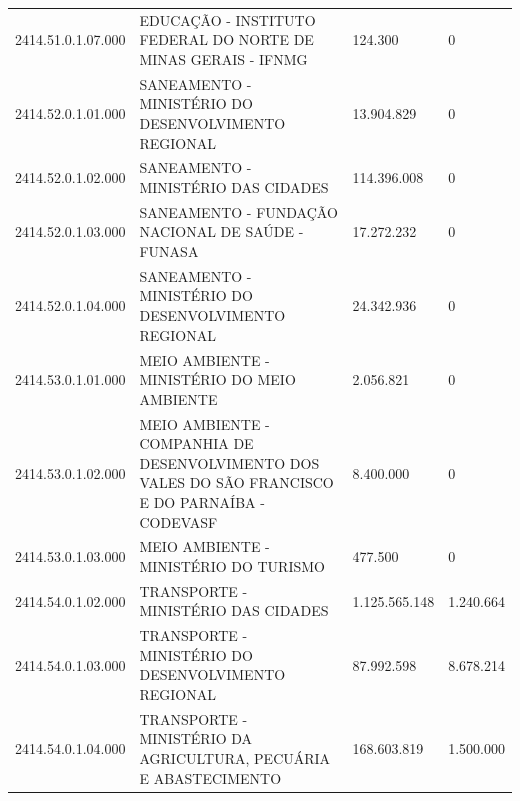 \documentclass{article}
\begin{document}
\begin{longtable}[c]{m{2cm}|m{11cm}|m{2cm}m{2cm}}
\multicolumn{1}{C{2cm}|}{2414.51.0.1.07.000} & \multicolumn{1}{L{11cm}|}{EDUCAÇÃO - INSTITUTO FEDERAL DO NORTE DE MINAS GERAIS - IFNMG} & \multicolumn{1}{R{2cm}|}{124.300} & \multicolumn{1}{R{2cm}}{            0} \\
\multicolumn{1}{C{2cm}|}{2414.52.0.1.01.000} & \multicolumn{1}{L{11cm}|}{SANEAMENTO - MINISTÉRIO DO DESENVOLVIMENTO REGIONAL} & \multicolumn{1}{R{2cm}|}{13.904.829} & \multicolumn{1}{R{2cm}}{            0} \\
\multicolumn{1}{C{2cm}|}{2414.52.0.1.02.000} & \multicolumn{1}{L{11cm}|}{SANEAMENTO - MINISTÉRIO DAS CIDADES} & \multicolumn{1}{R{2cm}|}{114.396.008} & \multicolumn{1}{R{2cm}}{            0} \\
\multicolumn{1}{C{2cm}|}{2414.52.0.1.03.000} & \multicolumn{1}{L{11cm}|}{SANEAMENTO - FUNDAÇÃO NACIONAL DE SAÚDE - FUNASA} & \multicolumn{1}{R{2cm}|}{17.272.232} & \multicolumn{1}{R{2cm}}{            0} \\
\multicolumn{1}{C{2cm}|}{2414.52.0.1.04.000} & \multicolumn{1}{L{11cm}|}{SANEAMENTO - MINISTÉRIO DO DESENVOLVIMENTO REGIONAL} & \multicolumn{1}{R{2cm}|}{24.342.936} & \multicolumn{1}{R{2cm}}{            0} \\
\multicolumn{1}{C{2cm}|}{2414.53.0.1.01.000} & \multicolumn{1}{L{11cm}|}{MEIO AMBIENTE - MINISTÉRIO DO MEIO AMBIENTE} & \multicolumn{1}{R{2cm}|}{2.056.821} & \multicolumn{1}{R{2cm}}{            0} \\
\multicolumn{1}{C{2cm}|}{2414.53.0.1.02.000} & \multicolumn{1}{L{11cm}|}{MEIO AMBIENTE - COMPANHIA DE DESENVOLVIMENTO DOS VALES DO SÃO FRANCISCO E DO PARNAÍBA - CODEVASF} & \multicolumn{1}{R{2cm}|}{8.400.000} & \multicolumn{1}{R{2cm}}{            0} \\
\multicolumn{1}{C{2cm}|}{2414.53.0.1.03.000} & \multicolumn{1}{L{11cm}|}{MEIO AMBIENTE - MINISTÉRIO DO TURISMO} & \multicolumn{1}{R{2cm}|}{477.500} & \multicolumn{1}{R{2cm}}{            0} \\
\multicolumn{1}{C{2cm}|}{2414.54.0.1.02.000} & \multicolumn{1}{L{11cm}|}{TRANSPORTE - MINISTÉRIO DAS CIDADES} & \multicolumn{1}{R{2cm}|}{1.125.565.148} & \multicolumn{1}{R{2cm}}{1.240.664} \\
\multicolumn{1}{C{2cm}|}{2414.54.0.1.03.000} & \multicolumn{1}{L{11cm}|}{TRANSPORTE - MINISTÉRIO DO DESENVOLVIMENTO REGIONAL} & \multicolumn{1}{R{2cm}|}{87.992.598} & \multicolumn{1}{R{2cm}}{8.678.214} \\
\multicolumn{1}{C{2cm}|}{2414.54.0.1.04.000} & \multicolumn{1}{L{11cm}|}{TRANSPORTE - MINISTÉRIO DA AGRICULTURA, PECUÁRIA E ABASTECIMENTO} & \multicolumn{1}{R{2cm}|}{168.603.819} & \multicolumn{1}{R{2cm}}{1.500.000} \\

\end{longtable}
\end{document}
